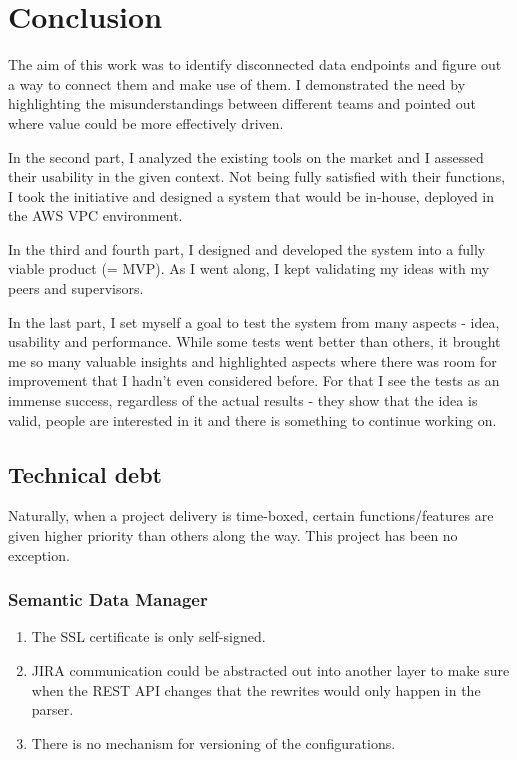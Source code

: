 \chapter{Conclusion}

The aim of this work was to identify disconnected data endpoints and figure out a way to connect them and make use of them. I demonstrated the need by highlighting the misunderstandings between different teams and pointed out where value could be more effectively driven.

In the second part, I analyzed the existing tools on the market and I assessed their usability in the given context. Not being fully satisfied with their functions, I took the initiative and designed a system that would be in-house, deployed in the AWS VPC environment. 

In the third and fourth part, I designed and developed the system into a fully viable product (= MVP). As I went along, I kept validating my ideas with my peers and supervisors.

In the last part, I set myself a goal to test the system from many aspects - idea, usability and performance. While some tests went better than others, it brought me so many valuable insights and highlighted aspects where there was room for improvement that I hadn't even considered before. For that I see the tests as an immense success, regardless of the actual results - they show that the idea is valid, people are interested in it and there is something to continue working on.

\section{Technical debt}

Naturally, when a project delivery is time-boxed, certain functions/features are given higher priority than others along the way. This project has been no exception.

\subsection{Semantic Data Manager}

\begin{enumerate}
	\item The SSL certificate is only self-signed.
	\item JIRA communication could be abstracted out into another layer to make sure when the REST API changes that the rewrites would only happen in the parser.
	\item There is no mechanism for versioning of the configurations.
\end{enumerate}

